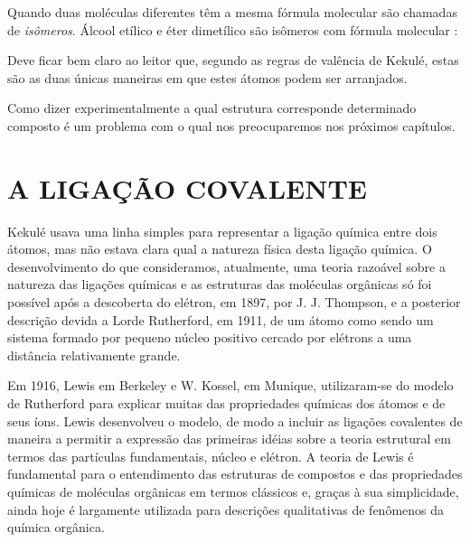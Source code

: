 Quando duas moléculas diferentes têm a mesma fórmula molecular são chamadas de \textit{isômeros}. Álcool etílico e éter dimetílico são isômeros com fórmula molecular : 

\begin{tightcenter}
    \chemnameinit{}
    \qquad\qquad\qquad
    \chemnameinit{}
\end{tightcenter}

Deve ficar bem claro ao leitor que, segundo as regras de valência de Kekulé, estas são as duas únicas maneiras em que estes átomos podem ser arranjados. 

Como dizer experimentalmente a qual estrutura corresponde determinado composto é um problema com o qual nos preocuparemos nos próximos capítulos. 

\section{A LIGAÇÃO COVALENTE}

Kekulé usava uma linha simples para representar a ligação química entre dois átomos, mas não estava clara qual a natureza física desta ligação química. O desenvolvimento do que consideramos, atualmente, uma teoria razoável sobre a natureza das ligações químicas e as estruturas das moléculas orgânicas só foi possível após a descoberta do elétron, em 1897, por J. J. Thompson, e a posterior descrição devida a Lorde Rutherford, em 1911, de um átomo como sendo um sistema formado por pequeno núcleo positivo cercado por elétrons a uma distância relativamente grande. 

Em 1916, Lewis em Berkeley e W. Kossel, em Munique, utilizaram-se do modelo de Rutherford para explicar muitas das propriedades químicas dos átomos e de seus íons. Lewis desenvolveu o modelo, de modo a incluir as ligações covalentes de maneira a permitir a expressão das primeiras idéias sobre a teoria estrutural em termos das partículas fundamentais, núcleo e elétron. A teoria de Lewis é fundamental para o entendimento das estruturas de compostos e das propriedades químicas de moléculas orgânicas em termos clássicos e, graças à sua simplicidade, ainda hoje é largamente utilizada para descrições qualitativas de fenômenos da química orgânica. 

